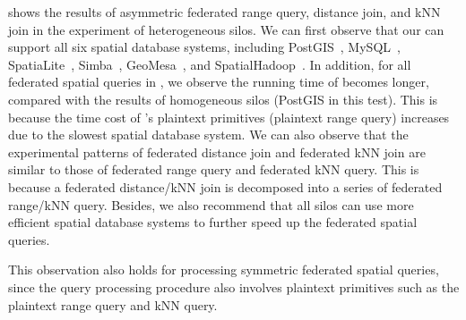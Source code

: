  shows the results of asymmetric federated range query, distance join, and kNN join in the experiment of heterogeneous silos.
We can first observe that our \sysname can support all six spatial database systems, including PostGIS~\cite{postgis}, MySQL~\cite{mysql}, SpatiaLite~\cite{spatialite}, Simba~\cite{sigmod16simba}, GeoMesa~\cite{ds15geomesa}, and SpatialHadoop~\cite{icde15spatialhadoop}.
In addition, for all federated spatial queries in , we observe the running time of \sysname becomes longer, compared with the results of homogeneous silos (\ie PostGIS in this test).
This is because the time cost of \sysname's plaintext primitives (\ie plaintext range query) increases due to the slowest spatial database system.
We can also observe that the experimental patterns of federated distance join and federated kNN join are similar to those of federated range query and federated kNN query.
This is because a federated distance/kNN join is decomposed into a series of federated range/kNN query.
Besides, we also recommend that all silos can use more efficient spatial database systems to further speed up the federated spatial queries.

This observation also holds for processing symmetric federated spatial queries, since the query processing procedure also involves plaintext primitives such as the plaintext range query and kNN query.

